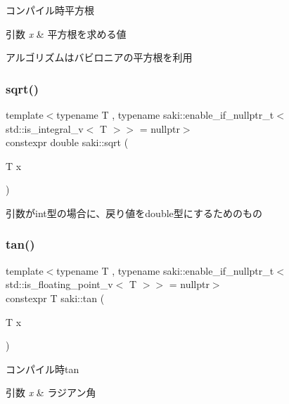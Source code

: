 コンパイル時平方根 


\begin{DoxyParams}{引数}
{\em x} & 平方根を求める値\\
\hline
\end{DoxyParams}
アルゴリズムはバビロニアの平方根を利用 \mbox{\label{namespacesaki_a66fac13294984ad19b8b7fec3b5466b5}} 
\subsubsection{\texorpdfstring{sqrt()}{sqrt()}\hspace{0.1cm}{\footnotesize\ttfamily [2/2]}}
{\footnotesize\ttfamily template$<$typename T , typename saki\+::enable\+\_\+if\+\_\+nullptr\+\_\+t$<$ std\+::is\+\_\+integral\+\_\+v$<$ T $>$$>$  = nullptr$>$ \\
constexpr double saki\+::sqrt (\begin{DoxyParamCaption}\item[{T}]{x }\end{DoxyParamCaption})}



引数がint型の場合に、戻り値をdouble型にするためのもの 

\mbox{\label{namespacesaki_a491321db8475898649b625dca5401726}} 
\subsubsection{\texorpdfstring{tan()}{tan()}\hspace{0.1cm}{\footnotesize\ttfamily [1/2]}}
{\footnotesize\ttfamily template$<$typename T , typename saki\+::enable\+\_\+if\+\_\+nullptr\+\_\+t$<$ std\+::is\+\_\+floating\+\_\+point\+\_\+v$<$ T $>$$>$  = nullptr$>$ \\
constexpr T saki\+::tan (\begin{DoxyParamCaption}\item[{T}]{x }\end{DoxyParamCaption})}



コンパイル時tan 


\begin{DoxyParams}{引数}
{\em x} & ラジアン角 \\
\hline
\end{DoxyParams}
\mbox{\label{namespacesaki_a52704083849bbdf4ab635cca985c00ae}} 
